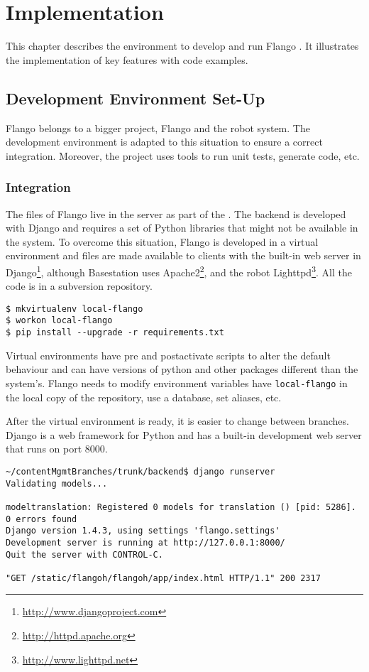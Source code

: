 \chapter{Implementation}
\label{chap:implementation}
This chapter describes the environment to develop and run Flango \cm.
It illustrates the implementation of key features with code examples.

\section{Development Environment Set-Up}
Flango \cm belongs to a bigger project, Flango and the robot system.
The development environment is adapted to this situation to ensure a correct integration.
Moreover, the project uses tools to run unit tests, generate code, etc.

\subsection*{Integration}
The files of Flango \cm live in the server as part of the \flangobe .
The backend is developed with Django and requires a set of Python libraries that might not be available in the system.
To overcome this situation, Flango is developed in a virtual environment and files are made available to clients with the built-in web server in Django\footnote{\url{http://www.djangoproject.com}}, although Basestation uses Apache2\footnote{\url{http://httpd.apache.org}}, and the robot Lighttpd\footnote{\url{http://www.lighttpd.net}}.
All the code is in a subversion repository.

\begin{lstlisting}[caption=Creation of virtual environments, label=virtual-env]
$ mkvirtualenv local-flango
$ workon local-flango
$ pip install --upgrade -r requirements.txt
\end{lstlisting}

Virtual environments have pre and postactivate scripts to alter the default behaviour and can have versions of python and other packages different than the system's.
Flango needs to modify environment variables have \texttt{local-flango} in the local copy of the repository, use a database, set aliases, etc.

After the virtual environment is ready, it is easier to change between branches.
Django is a web framework for Python and has a built-in development web server that runs on port 8000.

\begin{lstlisting}[caption=Django web server, label=virtual-env-server]
~/contentMgmtBranches/trunk/backend$ django runserver
Validating models...

modeltranslation: Registered 0 models for translation () [pid: 5286].
0 errors found
Django version 1.4.3, using settings 'flango.settings'
Development server is running at http://127.0.0.1:8000/
Quit the server with CONTROL-C.

"GET /static/flangoh/flangoh/app/index.html HTTP/1.1" 200 2317
\end{lstlisting}


